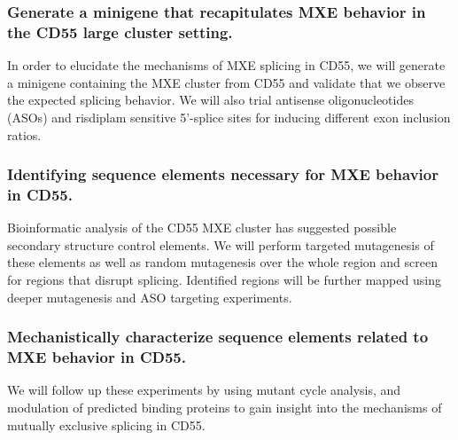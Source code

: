 \documentclass{article}
\begin{document}
\subsubsection{Generate a minigene that recapitulates MXE behavior in the CD55 large cluster setting.}  In order to elucidate the mechanisms of MXE splicing in CD55, we will generate a minigene containing the MXE cluster from CD55 and validate that we observe the expected splicing behavior. We will also trial antisense oligonucleotides (ASOs) and risdiplam sensitive 5'-splice sites for inducing different exon inclusion ratios.
%
\subsubsection{Identifying sequence elements necessary for MXE behavior in CD55.} Bioinformatic analysis of the CD55 MXE cluster has suggested possible secondary structure control elements.\Cite{Hatje2017-oj} We will perform targeted mutagenesis of these elements as well as random mutagenesis over the whole region and screen for regions that disrupt splicing. Identified regions will be further mapped using deeper mutagenesis and ASO targeting experiments.
%
\subsubsection{Mechanistically characterize sequence elements related to MXE behavior in CD55.} We will follow up these experiments by using mutant cycle analysis, and modulation of predicted binding proteins to gain insight into the mechanisms of mutually exclusive splicing in CD55.




\printbibliography
\end{document}
